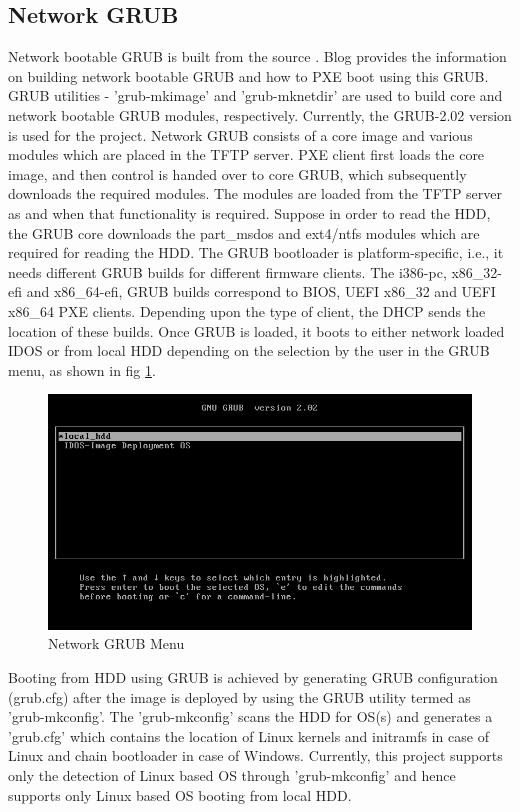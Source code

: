 \documentclass[a4paper,12pt]{article}
\begin{document}
\subsection{ Network GRUB}
Network bootable GRUB is built from the source \cite{GRUB}. Blog \cite{PXEb} provides the information on building network bootable GRUB and how to PXE boot using this GRUB. GRUB utilities - 'grub-mkimage' and 'grub-mknetdir' are used to build core and network bootable GRUB modules, respectively. Currently, the GRUB-2.02 version is used for the project. Network GRUB consists of a core image and various modules which are placed in the TFTP server. PXE client first loads the core image, and then control is handed over to core GRUB, which subsequently downloads the required modules. The modules are loaded from the TFTP server as and when that functionality is required. Suppose in order to read the HDD, the GRUB core downloads the part\_msdos and ext4/ntfs modules which are required for reading the HDD. The GRUB bootloader is platform-specific, i.e., it needs different GRUB builds for different firmware clients. The i386-pc, x86\_32-efi and x86\_64-efi, GRUB builds correspond to BIOS,  UEFI x86\_32 and UEFI x86\_64 PXE clients. Depending upon the type of client, the DHCP sends the location of these builds. Once GRUB is loaded, it boots to either network loaded IDOS or from local HDD depending on the selection by the user in the GRUB menu, as shown in fig \ref{grub}. 
\begin{figure}[h!]
    \centering
    \includegraphics[width=\linewidth]{grub.png}
    \caption{Network GRUB Menu}
    \label{grub}
\end{figure}

Booting from HDD using GRUB is achieved by generating GRUB configuration (grub.cfg) after the image is deployed by using the GRUB utility termed as 'grub-mkconfig'. The 'grub-mkconfig' scans the HDD for OS(s) and generates a 'grub.cfg' which contains the location of Linux kernels and initramfs in case of Linux and chain bootloader in case of Windows. Currently, this project supports only the detection of Linux based OS through 'grub-mkconfig' and hence supports only Linux based OS booting from local HDD.
\end{document}
